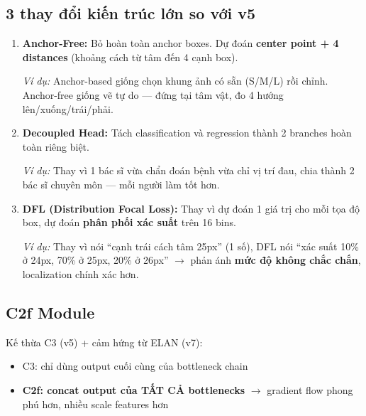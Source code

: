 \subsection{3 thay đổi kiến trúc lớn so với v5}
\begin{enumerate}
    \item \textbf{Anchor-Free:} Bỏ hoàn toàn anchor boxes. Dự đoán \textbf{center point + 4 distances} (khoảng cách từ tâm đến 4 cạnh box).
    
    \textit{Ví dụ:} Anchor-based giống chọn khung ảnh có sẵn (S/M/L) rồi chỉnh. Anchor-free giống vẽ tự do --- đứng tại tâm vật, đo 4 hướng lên/xuống/trái/phải.
    
    \item \textbf{Decoupled Head:} Tách classification và regression thành 2 branches hoàn toàn riêng biệt.
    
    \textit{Ví dụ:} Thay vì 1 bác sĩ vừa chẩn đoán bệnh vừa chỉ vị trí đau, chia thành 2 bác sĩ chuyên môn --- mỗi người làm tốt hơn.
    
    \item \textbf{DFL (Distribution Focal Loss):} Thay vì dự đoán 1 giá trị cho mỗi tọa độ box, dự đoán \textbf{phân phối xác suất} trên 16 bins.
    
    \textit{Ví dụ:} Thay vì nói ``cạnh trái cách tâm 25px'' (1 số), DFL nói ``xác suất 10\% ở 24px, 70\% ở 25px, 20\% ở 26px'' $\rightarrow$ phản ánh \textbf{mức độ không chắc chắn}, localization chính xác hơn.
\end{enumerate}

\subsection{C2f Module}
Kế thừa C3 (v5) + cảm hứng từ ELAN (v7):
\begin{itemize}
    \item C3: chỉ dùng output cuối cùng của bottleneck chain
    \item \textbf{C2f: concat output của TẤT CẢ bottlenecks} $\rightarrow$ gradient flow phong phú hơn, nhiều scale features hơn
\end{itemize}

